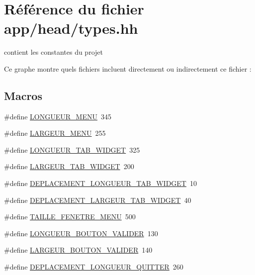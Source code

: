 \hypertarget{types_8hh}{}\section{Référence du fichier app/head/types.hh}
\label{types_8hh}


contient les constantes du projet  


Ce graphe montre quels fichiers incluent directement ou indirectement ce fichier \+:
\subsection*{Macros}
\begin{DoxyCompactItemize}
\item 
\#define \hyperlink{types_8hh_a588c0cfa05425b74140ac3a0a08b34e1}{L\+O\+N\+G\+U\+E\+U\+R\+\_\+\+M\+E\+NU}~345
\item 
\#define \hyperlink{types_8hh_ab395b90346e292578f3b819b1863a5e2}{L\+A\+R\+G\+E\+U\+R\+\_\+\+M\+E\+NU}~255
\item 
\#define \hyperlink{types_8hh_a8c6906c4a2c6d5c54dd205dc9d0b9b28}{L\+O\+N\+G\+U\+E\+U\+R\+\_\+\+T\+A\+B\+\_\+\+W\+I\+D\+G\+ET}~325
\item 
\#define \hyperlink{types_8hh_afddbd066767ac9d0ad7db2dbf5201495}{L\+A\+R\+G\+E\+U\+R\+\_\+\+T\+A\+B\+\_\+\+W\+I\+D\+G\+ET}~200
\item 
\#define \hyperlink{types_8hh_a4ba1764c6ac264a1dbb7935b275e62dc}{D\+E\+P\+L\+A\+C\+E\+M\+E\+N\+T\+\_\+\+L\+O\+N\+G\+U\+E\+U\+R\+\_\+\+T\+A\+B\+\_\+\+W\+I\+D\+G\+ET}~10
\item 
\#define \hyperlink{types_8hh_ac1328227e9dacc118dc55a7da6b0fc3c}{D\+E\+P\+L\+A\+C\+E\+M\+E\+N\+T\+\_\+\+L\+A\+R\+G\+E\+U\+R\+\_\+\+T\+A\+B\+\_\+\+W\+I\+D\+G\+ET}~40
\item 
\#define \hyperlink{types_8hh_a22c0f1d774ff7f8f6776252ad2fe365d}{T\+A\+I\+L\+L\+E\+\_\+\+F\+E\+N\+E\+T\+R\+E\+\_\+\+M\+E\+NU}~500
\item 
\#define \hyperlink{types_8hh_acdf2b3c2a1aa78038679af2acaa66b76}{L\+O\+N\+G\+U\+E\+U\+R\+\_\+\+B\+O\+U\+T\+O\+N\+\_\+\+V\+A\+L\+I\+D\+ER}~130
\item 
\#define \hyperlink{types_8hh_a5f46f7f175f6b68f39a96a0b6919f54a}{L\+A\+R\+G\+E\+U\+R\+\_\+\+B\+O\+U\+T\+O\+N\+\_\+\+V\+A\+L\+I\+D\+ER}~140
\item 
\#define \hyperlink{types_8hh_a5678f0fb55a874509e6ad5acbef80759}{D\+E\+P\+L\+A\+C\+E\+M\+E\+N\+T\+\_\+\+L\+O\+N\+G\+U\+E\+U\+R\+\_\+\+Q\+U\+I\+T\+T\+ER}~260

\end{DoxyCompactItemize}
